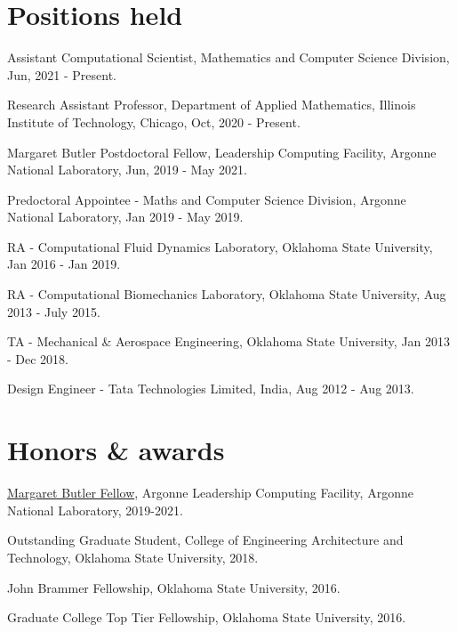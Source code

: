 \documentclass[letterpaper]{article}
\renewenvironment{itemize}{
  \begin{list}{}{
    \setlength{\leftmargin}{1.5em}
  }
}{
  \end{list}
}
\begin{document}
\section*{Positions held}
\begin{itemize}
\item Assistant Computational Scientist, Mathematics and Computer Science Division, Jun, 2021 - Present.
\item Research Assistant Professor, Department of Applied Mathematics, Illinois Institute of Technology, Chicago, Oct, 2020 - Present.
\item Margaret Butler Postdoctoral Fellow, Leadership Computing Facility, Argonne National Laboratory, Jun, 2019 - May 2021.
\item Predoctoral Appointee - Maths and Computer Science Division, Argonne National Laboratory, Jan 2019 - May 2019.
\item RA - Computational Fluid Dynamics Laboratory, Oklahoma State University, Jan 2016 - Jan 2019.
\item RA - Computational Biomechanics Laboratory, Oklahoma State University, Aug 2013 - July 2015.
\item TA - Mechanical \& Aerospace Engineering, Oklahoma State University, Jan 2013 - Dec 2018.
\item Design Engineer - Tata Technologies Limited, India, Aug 2012 - Aug 2013.
\end{itemize}

\section*{Honors \& awards}

\begin{itemize}

\item \href{https://www.alcf.anl.gov/margaret-butler-fellowship-computational-science}{Margaret Butler Fellow}, Argonne Leadership Computing Facility, Argonne National Laboratory, 2019-2021.

\item Outstanding Graduate Student, College of Engineering Architecture and Technology, Oklahoma State University, 2018.

\item John Brammer Fellowship, Oklahoma State University, 2016.

\item Graduate College Top Tier Fellowship, Oklahoma State University, 2016.

\end{itemize}
\end{document}
